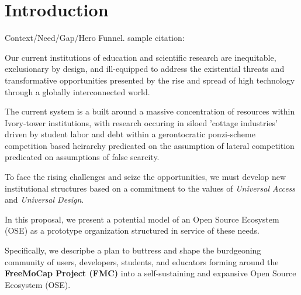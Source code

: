 \documentclass[11pt]{article}
\begin{document}
\pagestyle{empty} 
\setlength{\baselineskip}{12.6pt} 


\section{Introduction\label{sec:intro}}
 Context/Need/Gap/Hero Funnel. 
 sample citation: \cite{matthis_retinal_2022} 

Our current institutions of education and scientific research are inequitable, exclusionary by design, and ill-equipped to address the existential threats and transformative opportunities presented by the rise and spread of high technology through a globally interconnected world.

The current system is a built around a massive concentration of resources within Ivory-tower institutions, with research occuring in siloed 'cottage industries' driven by student labor and debt within a gerontocratic ponzi-scheme competition based heirarchy predicated on the assumption of lateral competition predicated on assumptions of false scarcity. 

To face the rising challenges and seize the opportunities, we must develop new institutional structures based on a commitment to the values of \textit{Universal Access} and \textit{Universal Design}. 


In this proposal, we present a potential model of an Open Source Ecosystem (OSE) as a prototype organization structured in service of these needs. 

Specifically, we descripbe a plan to buttress and shape the burdgeoning community of users, developers, students, and educators forming around the \textbf{FreeMoCap Project (FMC)} into a self-sustaining and expansive Open Source Ecosystem (OSE). 


\end{document}
